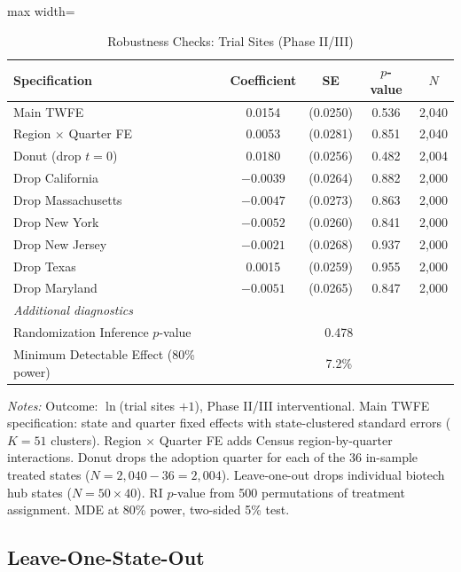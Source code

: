 \documentclass[12pt]{article}
\begin{document}
\begin{table}[H]
\centering
\caption{Robustness Checks: Trial Sites (Phase II/III)}
\label{tab:robust}
\begin{adjustbox}{max width=\textwidth}
\begin{tabular}{lcccc}
\toprule
Specification & Coefficient & SE & $p$-value & $N$ \\
\midrule
Main TWFE & 0.0154 & (0.0250) & 0.536 & 2,040 \\
Region $\times$ Quarter FE & 0.0053 & (0.0281) & 0.851 & 2,040 \\
Donut (drop $t=0$) & 0.0180 & (0.0256) & 0.482 & 2,004 \\
Drop California & $-0.0039$ & (0.0264) & 0.882 & 2,000 \\
Drop Massachusetts & $-0.0047$ & (0.0273) & 0.863 & 2,000 \\
Drop New York & $-0.0052$ & (0.0260) & 0.841 & 2,000 \\
Drop New Jersey & $-0.0021$ & (0.0268) & 0.937 & 2,000 \\
Drop Texas & 0.0015 & (0.0259) & 0.955 & 2,000 \\
Drop Maryland & $-0.0051$ & (0.0265) & 0.847 & 2,000 \\
\midrule
\multicolumn{5}{l}{\textit{Additional diagnostics}} \\
Randomization Inference $p$-value & \multicolumn{4}{c}{0.478} \\
Minimum Detectable Effect (80\% power) & \multicolumn{4}{c}{7.2\%} \\
\bottomrule
\end{tabular}
\end{adjustbox}
\begin{minipage}{0.95\textwidth}
\vspace{0.3em}
\footnotesize \textit{Notes:} Outcome: $\ln$(trial sites $+ 1$), Phase II/III interventional. Main TWFE specification: state and quarter fixed effects with state-clustered standard errors ($K = 51$ clusters). Region $\times$ Quarter FE adds Census region-by-quarter interactions. Donut drops the adoption quarter for each of the 36 in-sample treated states ($N = 2{,}040 - 36 = 2{,}004$). Leave-one-out drops individual biotech hub states ($N = 50 \times 40$). RI $p$-value from 500 permutations of treatment assignment. MDE at 80\% power, two-sided 5\% test.
\end{minipage}
\end{table}

\subsection{Leave-One-State-Out}
\end{document}
